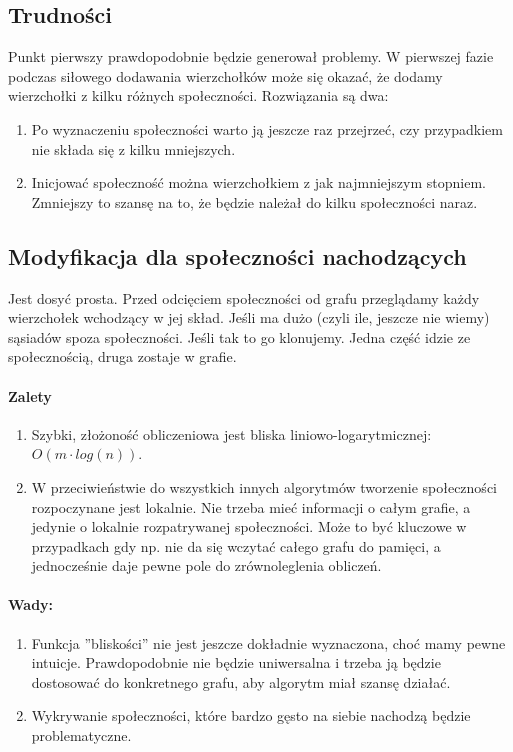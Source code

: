 \documentclass{article}
\begin{document}
\subsection{Trudności}
Punkt pierwszy prawdopodobnie będzie generował problemy. W pierwszej fazie podczas siłowego dodawania wierzchołków może się okazać, że dodamy wierzchołki z kilku różnych społeczności. Rozwiązania są dwa:
\begin{enumerate}
    \item Po wyznaczeniu społeczności warto ją jeszcze raz przejrzeć, czy przypadkiem nie składa się z kilku mniejszych.
    \item Inicjować społeczność można wierzchołkiem z jak najmniejszym stopniem. Zmniejszy to szansę na to, że będzie należał do kilku społeczności naraz.
\end{enumerate}

\subsection{Modyfikacja dla społeczności nachodzących}
Jest dosyć prosta. Przed odcięciem społeczności od grafu przeglądamy każdy wierzchołek wchodzący w jej skład. Jeśli ma dużo (czyli ile, jeszcze nie wiemy) sąsiadów spoza społeczności. Jeśli tak to go klonujemy. Jedna część idzie ze społecznością, druga zostaje w grafie.

\paragraph{Zalety}
\begin{enumerate}
    \item Szybki, złożoność obliczeniowa jest bliska liniowo-logarytmicznej: $O(m\cdot log(n))$.
    \item W przeciwieństwie do wszystkich innych algorytmów tworzenie społeczności rozpoczynane jest lokalnie. Nie trzeba mieć informacji o całym grafie, a jedynie o lokalnie rozpatrywanej społeczności. Może to być kluczowe w przypadkach gdy np. nie da się wczytać całego grafu do pamięci, a jednocześnie daje pewne pole do zrównoleglenia obliczeń.
\end{enumerate}
\paragraph{Wady:}
\begin{enumerate}
    \item Funkcja ''bliskości'' nie jest jeszcze dokładnie wyznaczona, choć mamy pewne intuicje. Prawdopodobnie nie będzie uniwersalna i trzeba ją będzie dostosować do konkretnego grafu, aby algorytm miał szansę działać.
    \item Wykrywanie społeczności, które bardzo gęsto na siebie nachodzą będzie problematyczne.
\end{enumerate}
\end{document}
